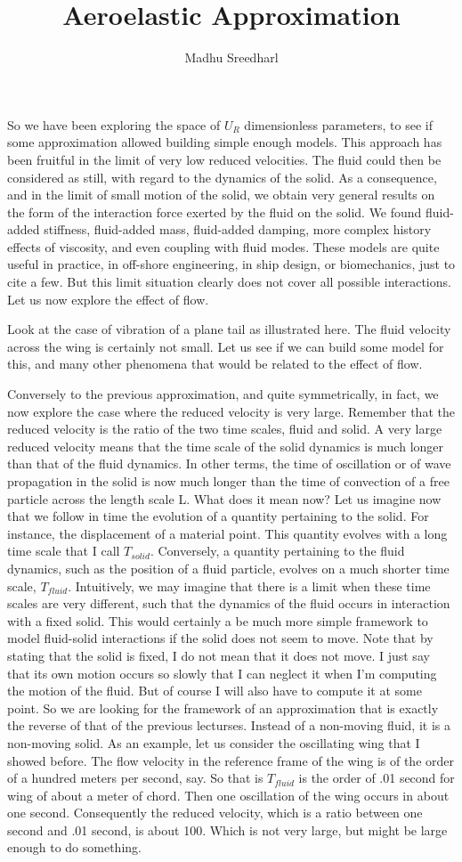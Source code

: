 \documentclass{article}
\title{Aeroelastic Approximation}
\author{Madhu Sreedharl}
\begin{document}
 So we have been exploring the space
of $U_R$ dimensionless  parameters, to see if some approximation allowed
building simple enough models. This approach has been fruitful in
the limit of very low reduced velocities. The fluid could then be
considered as still, with regard to the dynamics of the solid. As a consequence, and in the limit of small motion of the solid,
we obtain very general results on the form of the interaction force
exerted by the fluid on the solid. We found fluid-added stiffness,
fluid-added mass, fluid-added damping, more complex history effects of viscosity,
and even coupling with fluid modes. These models are quite useful in practice, in off-shore engineering, in ship design,
or biomechanics, just to cite a few. But this limit situation clearly does
not cover all possible interactions. Let us now explore the effect of flow.

 Look at the case of vibration of
a plane tail as illustrated here. The fluid velocity across
the wing is certainly not small. Let us see if we can build some model for
this, and many other phenomena that would
be related to the effect of flow. 

 Conversely to the previous approximation,
and quite symmetrically, in fact, we now explore the case where
the reduced velocity is very large. Remember that the reduced velocity
is the ratio of the two time scales, fluid and solid. A very large reduced velocity
means that the time scale of the solid dynamics is much longer
than that of the fluid dynamics. In other terms, the time of oscillation or of wave propagation in the solid is
now much longer than the time of convection of a free particle
across the length scale L. What does it mean now? Let us imagine now that we follow in time
the evolution of a quantity pertaining to the solid. For instance,
the displacement of a material point. This quantity evolves with a long
time scale that I call $T_{solid}$. Conversely, a quantity pertaining to
the fluid dynamics, such as the position of a fluid particle, evolves on a much
shorter time scale, $T_{fluid}$. Intuitively, we may imagine
that there is a limit when these time scales are very different, such that the dynamics of the fluid 
occurs in interaction with a fixed solid. This would certainly a  be much more
simple framework to model fluid-solid interactions if the solid
does not seem to move. Note that by stating
that the solid is fixed, I do not mean that it does not move. I just say that its own motion occurs so slowly that I can neglect it
when I'm computing the motion of the fluid. But of course I will also
have to compute it at some point. So we are looking for
the framework of an approximation that is exactly the reverse of
that of the previous lecturses. Instead of a non-moving fluid,
it is a non-moving solid. As an example, let us consider
the oscillating wing that I showed before. The flow velocity in the reference
frame of the wing is of the order of a hundred meters per second, say. So that is $T_{fluid}$ is the order of .01 second for wing of about a meter of  chord. Then one oscillation of the wing
occurs in about one second. Consequently the reduced velocity,
which is a ratio between one second and .01 second, is about 100. Which is not very large, but
might be large enough to do something. 
\end{document}
